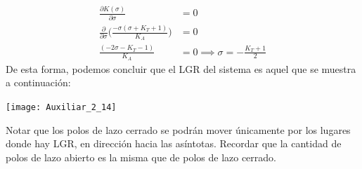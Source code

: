 \documentclass[
  11pt,
  letterpaper,
   addpoints,
   answers
  ]{exam}
\begin{document}
\begin{questions}
\begin{solution}
\begin{enumerate}
        \begin{align}
            \frac{\partial K(\sigma)}{\partial \sigma} &= 0 \nonumber\\
            \frac{\partial}{\partial \sigma}\Big( \frac{-\sigma(\sigma+K_T+1)}{K_A} \Big) &= 0 \nonumber\\
            \frac{(-2\sigma-K_T -1)}{K_A} &= 0 \implies \boxed{\sigma = -\frac{K_T + 1}{2}} \label{eq6}
        \end{align}
        De esta forma, podemos concluir que el LGR del sistema es aquel que se muestra a continuación:
        \begin{center}
            \texttt{[image: Auxiliar\_2\_14]}
          \end{center}
    \end{enumerate}
    Notar que los polos de lazo cerrado se podrán mover únicamente por los lugares donde hay LGR, en dirección hacia las asíntotas. Recordar que la cantidad de polos de lazo abierto es la misma que de polos de lazo cerrado. \\


\end{solution}
\end{questions}
\end{document}
